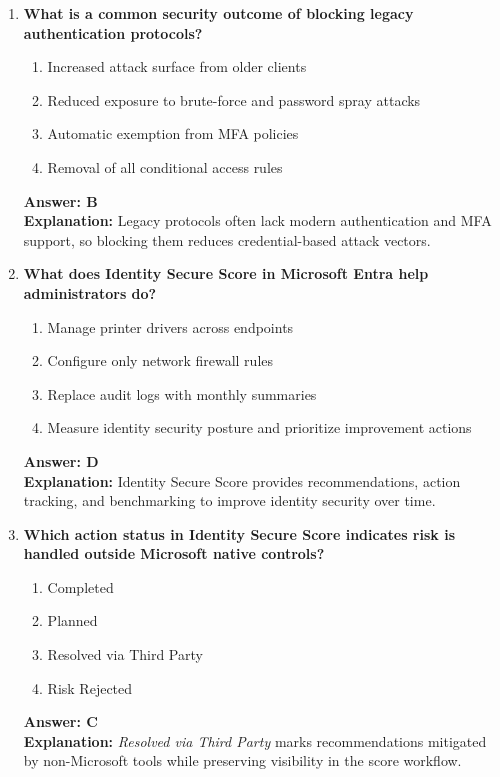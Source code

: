 \documentclass[10pt]{article}
\begin{document}
\begin{enumerate}[leftmargin=*]
\item \textbf{What is a common security outcome of blocking legacy authentication protocols?}
\begin{enumerate}[label=\Alph*.]
  \item Increased attack surface from older clients
  \item Reduced exposure to brute-force and password spray attacks
  \item Automatic exemption from MFA policies
  \item Removal of all conditional access rules
\end{enumerate}
\textbf{Answer: B}\\
\textbf{Explanation:} Legacy protocols often lack modern authentication and MFA support, so blocking them reduces credential-based attack vectors.

\item \textbf{What does Identity Secure Score in Microsoft Entra help administrators do?}
\begin{enumerate}[label=\Alph*.]
  \item Manage printer drivers across endpoints
  \item Configure only network firewall rules
  \item Replace audit logs with monthly summaries
  \item Measure identity security posture and prioritize improvement actions
\end{enumerate}
\textbf{Answer: D}\\
\textbf{Explanation:} Identity Secure Score provides recommendations, action tracking, and benchmarking to improve identity security over time.

\item \textbf{Which action status in Identity Secure Score indicates risk is handled outside Microsoft native controls?}
\begin{enumerate}[label=\Alph*.]
  \item Completed
  \item Planned
  \item Resolved via Third Party
  \item Risk Rejected
\end{enumerate}
\textbf{Answer: C}\\
\textbf{Explanation:} \textit{Resolved via Third Party} marks recommendations mitigated by non-Microsoft tools while preserving visibility in the score workflow.


\end{enumerate}
\end{document}
